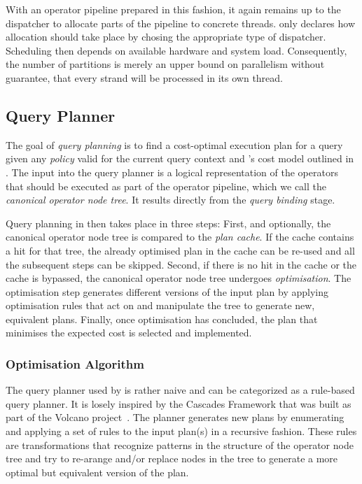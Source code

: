 With an operator pipeline prepared in this fashion, it again remains up to the dispatcher to allocate parts of the pipeline to concrete threads. \cottontail{} only declares how allocation should take place by chosing the appropriate type of dispatcher. Scheduling then depends on available hardware and system load. Consequently, the number of partitions is merely an upper bound on parallelism without guarantee, that every strand will be processed in its own thread. 

\subsection{Query Planner}
\label{section:cottontail_query_planner}

The goal of \emph{query planning} is to find a cost-optimal execution plan for a query given any \emph{policy} valid for the current query context and \cottontail{}'s cost model outlined in . The input into the query planner is a logical representation of the operators that should be executed as part of the operator pipeline, which we call the \emph{canonical operator node tree}. It results directly from the \emph{query binding} stage.

Query planning in \cottontail{} then takes place in three steps: First, and optionally, the canonical operator node tree is compared to the \emph{plan cache}. If the cache contains a hit for that tree, the already optimised plan in the cache can be re-used and all the subsequent steps can be skipped. Second, if there is no hit in the cache or the cache is bypassed, the canonical operator node tree undergoes \emph{optimisation}. The optimisation step generates different versions of the input plan by applying optimisation rules that act on and manipulate the tree to generate new, equivalent plans. Finally, once optimisation has concluded, the plan that minimises the expected cost is selected and implemented.

\subsubsection{Optimisation Algorithm}

The query planner used by \cottontail{} is rather naive and can be categorized as a rule-based query planner. It is losely inspired by the Cascades Framework that was built as part of the Volcano project~\cite{Graefe:1993Volcano}. The planner generates new plans by enumerating and applying a set of rules to the input plan(s) in a recursive fashion. These rules are transformations that recognize patterns in the structure of the operator node tree and try to re-arange and/or replace nodes in the tree to generate a more optimal but equivalent version of the plan.


